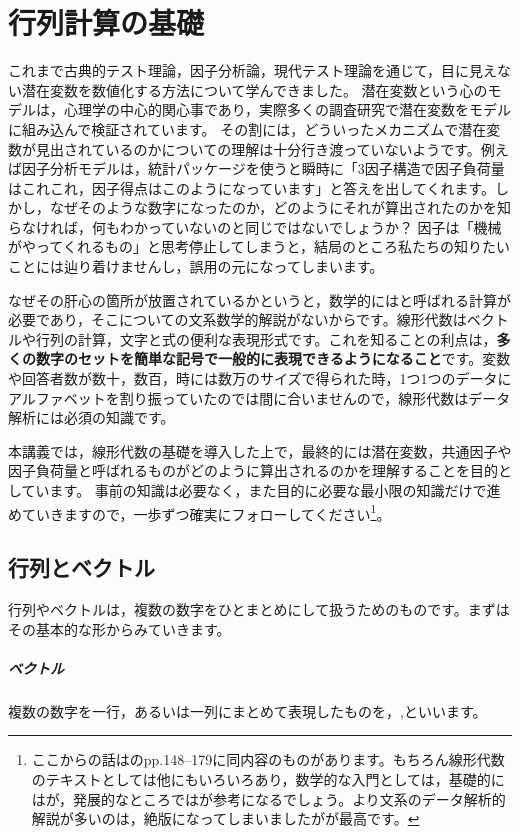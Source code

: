 \documentclass{ltjsbook}
\begin{document}
 
\chapter{行列計算の基礎} 
\label{chapter6} 
これまで古典的テスト理論，因子分析論，現代テスト理論を通じて，目に見えない潜在変数を数値化する方法について学んできました。
潜在変数という心のモデルは，心理学の中心的関心事であり，実際多くの調査研究で潜在変数をモデルに組み込んで検証されています。
その割には，どういったメカニズムで潜在変数が見出されているのかについての理解は十分行き渡っていないようです。例えば因子分析モデルは，統計パッケージを使うと瞬時に「3因子構造で因子負荷量はこれこれ，因子得点はこのようになっています」と答えを出してくれます。しかし，なぜそのような数字になったのか，どのようにそれが算出されたのかを知らなければ，何もわかっていないのと同じではないでしょうか？ 因子は「機械がやってくれるもの」と思考停止してしまうと，結局のところ私たちの知りたいことには辿り着けませんし，誤用の元になってしまいます。

なぜその肝心の箇所が放置されているかというと，数学的にはと呼ばれる計算が必要であり，そこについての文系数学的解説がないからです。線形代数はベクトルや行列の計算，文字と式の便利な表現形式です。これを知ることの利点は，\textbf{多くの数字のセットを簡単な記号で一般的に表現できるようになること}です。変数や回答者数が数十，数百，時には数万のサイズで得られた時，1つ1つのデータにアルファベットを割り振っていたのでは間に合いませんので，線形代数はデータ解析には必須の知識です。

本講義では，線形代数の基礎を導入した上で，最終的には潜在変数，共通因子や因子負荷量と呼ばれるものがどのように算出されるのかを理解することを目的としています。
事前の知識は必要なく，また目的に必要な最小限の知識だけで進めていきますので，一歩ずつ確実にフォローしてください\footnote{ここからの話は\citet{kosugi2018}のpp.148--179に同内容のものがあります。もちろん線形代数のテキストとしては他にもいろいろあり，数学的な入門としては，基礎的には\citet{村上正康2016-03-01}が，発展的なところでは\citet{永田靖2005-04-01}が参考になるでしょう。より文系のデータ解析的解説が多いのは，絶版になってしまいましたが\citet{岡太彬訓2008-04-09}が最高です。}。


\section{行列とベクトル}
行列やベクトルは，複数の数字をひとまとめにして扱うためのものです。まずはその基本的な形からみていきます。

\paragraph{ベクトル}
複数の数字を一行，あるいは一列にまとめて表現したものを，,といいます。
\end{document}
